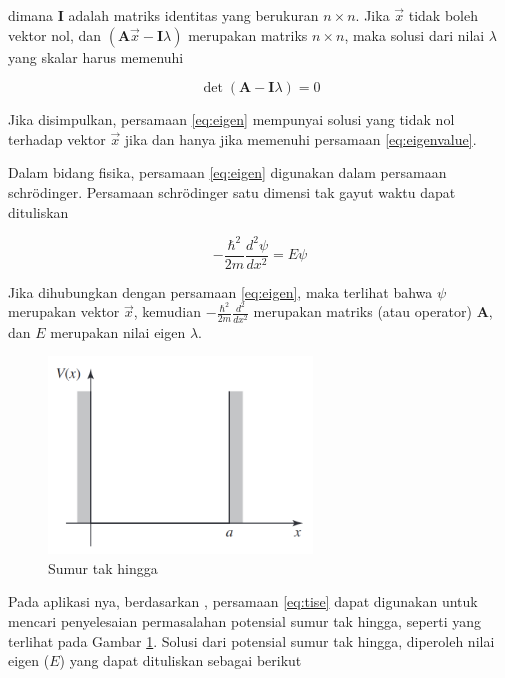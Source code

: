 \noindent
dimana $\mathbf{I}$ adalah matriks identitas yang berukuran $n \times n$. Jika
$\vec{x}$ tidak boleh vektor nol, dan $( \mathbf{A}\vec{x}- \mathbf{I}\lambda )$
merupakan matriks $n \times n$, maka solusi dari nilai $\lambda$ yang skalar
harus memenuhi

\begin{equation}
	\label{eq:eigenvalue}\det{(\mathbf{A} - \mathbf{I} \lambda)}= 0
\end{equation}

\noindent
Jika disimpulkan, persamaan \ref{eq:eigen} mempunyai solusi yang tidak nol terhadap
vektor $\vec{x}$ jika dan hanya jika memenuhi persamaan \ref{eq:eigenvalue}.

Dalam bidang fisika, persamaan \ref{eq:eigen} digunakan dalam persamaan
schrödinger. Persamaan schrödinger satu dimensi tak gayut waktu dapat
dituliskan

\begin{equation} \label{eq:tise} %
	-\frac{\hbar^2}{2m} \frac{d^2\psi}{dx^2} = E\psi
\end{equation}

\noindent
Jika dihubungkan dengan persamaan \ref{eq:eigen}, maka terlihat bahwa $\psi$
merupakan vektor $\vec{x}$, kemudian $-\frac{\hbar^2}{2m} \frac{d^2}{dx^2}$ merupakan
matriks (atau operator) $\mathbf{A}$, dan $E$ merupakan nilai eigen $\lambda$.

\begin{figure}[h]
	\centering
	\includegraphics[width=7cm]{images/infinite_square_well.png}
	\caption{Sumur tak hingga}
	\label{img:infinite_square_well}
\end{figure}

Pada aplikasi nya, berdasarkan
\cite{griffithsIntroductionQuantumMechanics2019}, persamaan \ref{eq:tise} dapat
digunakan untuk mencari penyelesaian permasalahan potensial sumur tak hingga,
seperti yang terlihat pada Gambar \ref{img:infinite_square_well}. Solusi dari
potensial sumur tak hingga, diperoleh nilai eigen ($E$) yang dapat dituliskan
sebagai berikut

